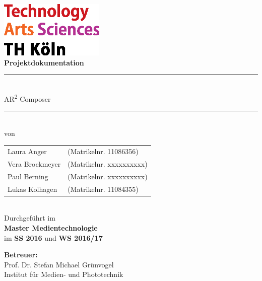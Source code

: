 \begin{center}
			\includegraphics[width=5cm]{Bilder/logo_TH}\\[12ex]
			{\Huge\textbf{Projektdokumentation}}\\[8ex]
			\rule{.8\textwidth}{.2pt}
			{\Large \\[2ex] AR\textsuperscript{2} Composer}\\
			\rule{.8\textwidth}{.2pt}\\[10ex]
			von\\[2ex]
			\begin{tabular}{ll}
			Laura Anger &(Matrikelnr. 11086356)\\ 
			Vera Brockmeyer &(Matrikelnr. xxxxxxxxxx)\\
			Paul Berning &(Matrikelnr. xxxxxxxxxx)\\
			Lukas Kolhagen &(Matrikelnr. 11084355)\\
			\end{tabular}\\[10ex]
			Durchgeführt im\\ \textbf{Master Medientechnologie}\\
			im \textbf{SS 2016} und \textbf{WS 2016/17}\\			
			\end{center}
			\vfill
			\begin{flushleft}
			{\bf Betreuer:}\\
			Prof. Dr. Stefan Michael Grünvogel\\
			Institut für Medien- und Phototechnik
			\end{flushleft}
	\newpage